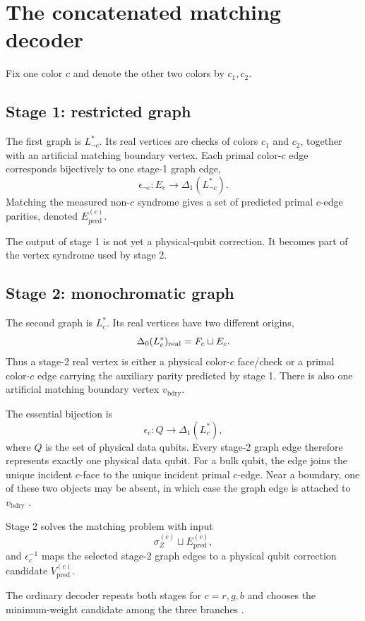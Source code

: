 \documentclass[11pt]{article}
\begin{document}
\section{The concatenated matching decoder}

Fix one color $c$ and denote the other two colors by $c_1,c_2$.

\subsection{Stage 1: restricted graph}

The first graph is $L_{\neg c}^*$. Its real vertices are checks of colors
$c_1$ and $c_2$, together with an artificial matching boundary vertex. Each
primal color-$c$ edge corresponds bijectively to one stage-1 graph edge,
\[
  \epsilon_{\neg c}:E_c\longrightarrow\Delta_1(L_{\neg c}^*).
\]
Matching the measured non-$c$ syndrome gives a set of predicted primal
$c$-edge parities, denoted $E_{\mathrm{pred}}^{(c)}$.

The output of stage 1 is not yet a physical-qubit correction. It becomes part
of the vertex syndrome used by stage 2.

\subsection{Stage 2: monochromatic graph}

The second graph is $L_c^*$. Its real vertices have two different origins,
\[
  \Delta_0(L_c^*)_{\rm real}=F_c\sqcup E_c.
\]
Thus a stage-2 real vertex is either a physical color-$c$ face/check or a
primal color-$c$ edge carrying the auxiliary parity predicted by stage 1.
There is also one artificial matching boundary vertex $v_{\mathrm{bdry}}$.

The essential bijection is
\[
  \epsilon_c:Q\longrightarrow\Delta_1(L_c^*),
\]
where $Q$ is the set of physical data qubits. Every stage-2 graph edge
therefore represents exactly one physical data qubit. For a bulk qubit, the
edge joins the unique incident $c$-face to the unique incident primal
$c$-edge. Near a boundary, one of these two objects may be absent, in which
case the graph edge is attached to $v_{\mathrm{bdry}}$ \cite{Lee}.

Stage 2 solves the matching problem with input
\[
  \sigma_Z^{(c)}\sqcup E_{\mathrm{pred}}^{(c)},
\]
and $\epsilon_c^{-1}$ maps the selected stage-2 graph edges to a physical
qubit correction candidate $V_{\mathrm{pred}}^{(c)}$.

The ordinary decoder repeats both stages for $c=r,g,b$ and chooses the
minimum-weight candidate among the three branches \cite{Lee}.
\end{document}
